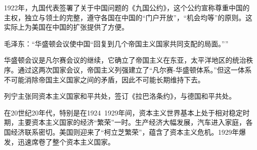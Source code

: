1922年，九国代表签署了关于中国问题的《九国公约》，这个公约宣称尊重中国的主权，独立与领土的完整，遵守各国在中国的“门户开放”，“机会均等”的原则。这实际上为美国在中国的扩张提供了方便。

毛泽东：“华盛顿会议使中国“回复到几个帝国主义国家共同支配的局面。””

华盛顿会议是凡尔赛会议的继续，它确立了帝国主义在东亚，太平洋地区的统治秩序。通过这两次国家会议，帝国主义列强建立了“凡尔赛-华盛顿体系。”但这一体系不可能消除帝国主义国家之间的矛盾，因此不可能长期维持下去。

列宁主张同资本主义国家和平共处，签订《拉巴洛条约》，与德国和平共处。

在20世纪20年代，特别是在1924~1929年间，资本主义世界基本上处于相对稳定时期，主要资本主义国家的经济“繁荣”一时。生产经济大幅发展，汽车进入家庭，各国经济联系密切。美国则迎来了“柯立芝繁荣”，蕴含了资本主义危机。1929年爆发，迅速席卷了整个资本主义国家。


